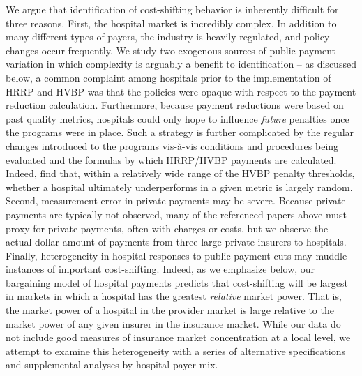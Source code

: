 \documentclass[12pt]{article}
\begin{document}
We argue that identification of cost-shifting behavior is inherently difficult for three reasons.  First, the hospital market is incredibly complex.  In addition to many different types of payers, the industry is heavily regulated, and policy changes occur frequently.  We study two exogenous sources of public payment variation in which complexity is arguably a benefit to identification -- as discussed below, a common complaint among hospitals prior to the implementation of HRRP and HVBP was that the policies were opaque with respect to the payment reduction calculation.  Furthermore, because payment reductions were based on past quality metrics, hospitals could only hope to influence \textit{future} penalties once the programs were in place. Such a strategy is further complicated by the regular changes introduced to the programs vis-\`a-vis conditions and procedures being evaluated and the formulas by which HRRP/HVBP payments are calculated. Indeed, \cite{friedson2016} find that, within a relatively wide range of the HVBP penalty thresholds, whether a hospital ultimately underperforms in a given metric is largely random. Second, measurement error in private payments may be severe.  Because private payments are typically not observed, many of the referenced papers above must proxy for private payments, often with charges or costs, but we observe the actual dollar amount of payments from three large private insurers to hospitals.  Finally, heterogeneity in hospital responses to public payment cuts may muddle instances of important cost-shifting.  Indeed, as we emphasize below, our bargaining model of hospital payments predicts that cost-shifting will be largest in markets in which a hospital has the greatest \textit{relative} market power.  That is, the market power of a hospital in the provider market is large relative to the market power of any given insurer in the insurance market.  While our data do not include good measures of insurance market concentration at a local level, we attempt to examine this heterogeneity with a series of alternative specifications and supplemental analyses by hospital payer mix.
\end{document}
